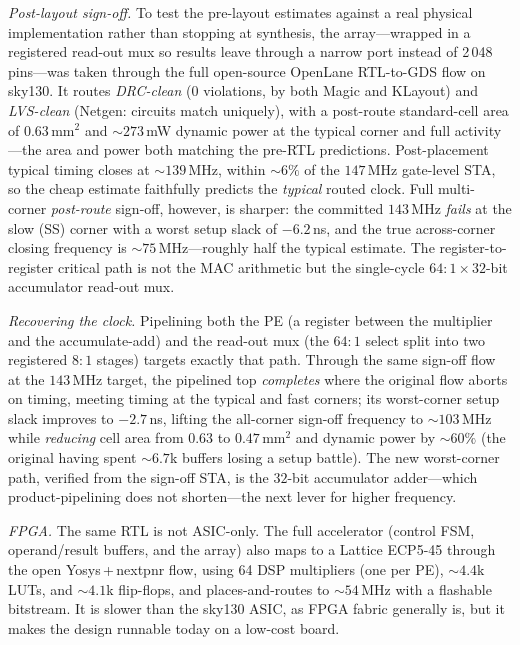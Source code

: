 \documentclass[conference]{IEEEtran}
\newcommand{\approxs}{\ensuremath{\sim}}
\begin{document}
\emph{Post-layout sign-off.} To test the pre-layout estimates against a real
physical implementation rather than stopping at synthesis, the array---wrapped in
a registered read-out mux so results leave through a narrow port instead of
2\,048 pins---was taken through the full open-source OpenLane RTL-to-GDS flow on
sky130. It routes \emph{DRC-clean} (0 violations, by both Magic and KLayout) and
\emph{LVS-clean} (Netgen: circuits match uniquely), with a post-route
standard-cell area of $0.63$\,mm$^2$ and \approxs$273$\,mW dynamic power at the
typical corner and full activity---the area and power both matching the pre-RTL
predictions. Post-placement typical timing closes at \approxs$139$\,MHz, within
\approxs$6\%$ of the $147$\,MHz gate-level STA, so the cheap estimate faithfully
predicts the \emph{typical} routed clock. Full multi-corner \emph{post-route}
sign-off, however, is sharper: the committed $143$\,MHz \emph{fails} at the slow
(SS) corner with a worst setup slack of $-6.2$\,ns, and the true across-corner
closing frequency is \approxs$75$\,MHz---roughly half the typical estimate. The
register-to-register critical path is not the MAC arithmetic but the single-cycle
$64{:}1{\times}32$-bit accumulator read-out mux.

\emph{Recovering the clock.} Pipelining both the PE (a register between the
multiplier and the accumulate-add) and the read-out mux (the $64{:}1$ select
split into two registered $8{:}1$ stages) targets exactly that path. Through the
same sign-off flow at the $143$\,MHz target, the pipelined top \emph{completes}
where the original flow aborts on timing, meeting timing at the typical and fast
corners; its worst-corner setup slack improves to $-2.7$\,ns, lifting the
all-corner sign-off frequency to \approxs$103$\,MHz while \emph{reducing} cell
area from $0.63$ to $0.47$\,mm$^2$ and dynamic power by \approxs$60\%$ (the
original having spent \approxs$6.7$k buffers losing a setup battle). The new
worst-corner path, verified from the sign-off STA, is the $32$-bit accumulator
adder---which product-pipelining does not shorten---the next lever for higher
frequency.

\emph{FPGA.} The same RTL is not ASIC-only. The full accelerator (control FSM,
operand/result buffers, and the array) also maps to a Lattice ECP5-45 through the
open Yosys\,+\,nextpnr flow, using 64 DSP multipliers (one per PE), \approxs$4.4$k
LUTs, and \approxs$4.1$k flip-flops, and places-and-routes to \approxs$54$\,MHz
with a flashable bitstream. It is slower than the sky130 ASIC, as FPGA fabric
generally is, but it makes the design runnable today on a low-cost board.
\end{document}
